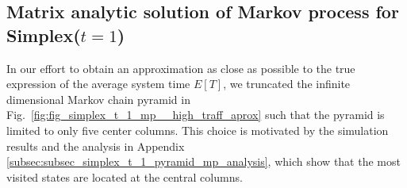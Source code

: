 \documentclass[sigconf,draft]{acmart}
\newcommand\mehmet[1]{\add[MA]{#1}}
\begin{document}

\subsection{Matrix analytic solution of Markov process for Simplex($t=1$)}
In our effort to obtain an approximation as close as possible to the true expression of the average system time $E[T]$, we truncated the infinite dimensional Markov chain pyramid in Fig.~\ref{fig:fig_simplex_t_1_mp__high_traff_aprox} such that the pyramid is limited to only five center columns. This choice is motivated by the simulation results and the analysis in Appendix \ref{subsec:subsec_simplex_t_1_pyramid_mp_analysis}, which show that the most visited states are located at the central columns.
\end{document}
